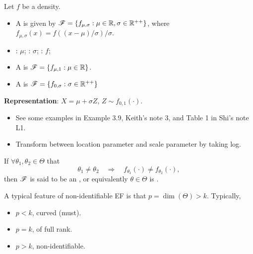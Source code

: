 \documentclass[10pt,a4paper]{book}
\begin{document}
\begin{defbox}
	\begin{definition}\label{def:ls-family}
		Let $f$ be a density. 
		\begin{itemize}
			\item A  is given by $\mathscr{F}=\{f_{\mu,\sigma}:\mu \in\mathbb R, \sigma\in\mathbb R^{++}\}$, where $f_{\mu,\sigma}(x)= f\left({(x-\mu)}/\sigma\right)/\sigma$.
			\item {}: $\mu$; : $\sigma$; : $f$;
			\item A  is $\mathscr{F}=\{f_{\mu,1}:\mu\in\mathbb R\}$.
			\item A  is $\mathscr{F}=\{f_{0,\sigma}:\sigma\in\mathbb R^{++}\}$ 
		\end{itemize}
	\end{definition}
\end{defbox}
\textbf{Representation}: $X=\mu + \sigma Z$, $Z\sim f_{0,1}(\cdot)$. 
\begin{itemize}
	\item See some examples in Example 3.9, Keith's note 3, and Table 1 in Shi's note L1. 
	\item Transform between location parameter and scale parameter by taking log.
\end{itemize}


\begin{defbox}
	\begin{definition}\label{def:id-family}
		If $\forall \theta_1,\theta_2\in\Theta$ that    
		\begin{equation*}
			\theta_1\neq\theta_2\quad\Rightarrow\quad f_{\theta_1}(\cdot)\neq f_{\theta_2}(\cdot),
		\end{equation*}
		then $\mathscr{F}$ is said to be an , or equivalently $\theta\in\Theta$ is . 
	\end{definition}
\end{defbox}

A typical feature of non-identifiable EF is that $p=\dim(\Theta)>k$. Typically,
\begin{itemize}
	\item $p<k$, curved (must).
	\item $p=k$, of full rank.
	\item $p>k$, non-identifiable.  
\end{itemize} 
\end{document}
